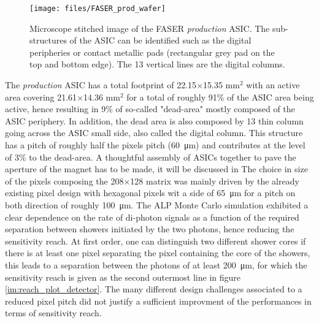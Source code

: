		\begin{figure}[h]
			\centering
			\texttt{[image: files/FASER\_prod\_wafer]}
			\caption{Microscope stitched image of the FASER \textit{production} ASIC. The sub-structures of the ASIC can be identified such as the digital peripheries or contact metallic pads (rectangular grey pad on the top and bottom edge). The 13 vertical lines are the digital columns.}
			\label{im:FASER_prod_wafer}
		\end{figure}
		
		The \textit{production} ASIC has a total footprint of 22.15$\times$15.35 mm$^2$ with an active area covering 21.61$\times$14.36 mm$^2$ for a total of roughly 91\% of the ASIC area being active, hence resulting in 9\% of so-called "dead-area" mostly composed of the ASIC periphery. In addition, the dead area is also composed by 13 thin column going across the ASIC small side, also called the digital column. This structure has a pitch of roughly half the pixels pitch (\SI{60}{\micro\meter}) and contributes at the level of 3\% to the dead-area. A thoughtful assembly of ASICs together to pave the aperture of the magnet has to be made, it will be discussed in  
		The choice in size of the pixels composing the 208$\times$128 matrix was mainly driven by the already existing pixel design with hexagonal pixels wit a side of \SI{65}{\micro\meter} for a pitch on both direction of roughly \SI{100}{\micro\meter}. The ALP Monte Carlo simulation exhibited a clear dependence on the rate of di-photon signals as a function of the required separation between showers initiated by the two photons, hence reducing the sensitivity reach. At first order, one can distinguish two different shower cores if there is at least one pixel separating the pixel containing the core of the showers, this leads to a separation between the photons of at least \SI{200}{\micro\meter}, for which the sensitivity reach is given as the second outermost line in figure \ref{im:reach_plot_detector}. The many different design challenges associated to a reduced pixel pitch did not justify a sufficient improvment of the performances in terms of sensitivity reach. 
		
